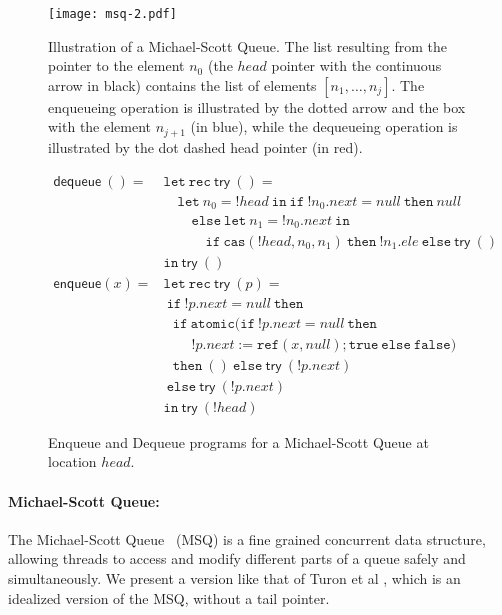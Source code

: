 \documentclass[nocopyrightspace,preprint]{sigplanconf}
\newcommand{\keywd}[1]{\mathtt{#1}}
\newcommand{\myread}[1]{!{#1}}
\newcommand{\myref}[1]{\keywd{ref}(#1)}
\newcommand{\mtrue}{\keywd{true}}
\newcommand{\mfalse}{\keywd{false}}
\newcommand{\cas}[3]{\keywd{cas}( #1, #2, #3)}
\begin{document}
\begin{figure}[t]
\begin{center}
 \texttt{[image: msq-2.pdf]} 
 \end{center}
\caption{Illustration of a Michael-Scott Queue. The list resulting from the pointer to the element $n_0$ (the $head$ pointer with the continuous arrow in black) contains the list of elements $[n_1, \ldots, n_j]$. The enqueueing operation is illustrated by the dotted arrow and the box with the element $n_{j+1}$ (in blue), while the dequeueing operation is illustrated by the dot dashed head pointer (in red).}
 \label{fig:MSQ}
\[
  \begin{array}{ll}
      \mathsf{dequeue}~ () = & \keywd{let\ rec}~ \mathsf{try}~() = \\&
   \quad \keywd{let}~ n_0 = \myread{head} ~\keywd{in}~
   \keywd{if}~\myread{n_0}.next = null~ \keywd{then}~ null~ 
   \\ & \qquad \keywd{else}~ \keywd{let}~ n_1 = \myread{n_0}.next ~\keywd{in}~
   \\ & \quad \qquad \keywd{if}~\cas{\myread{head}}{n_0}{n_1}~\keywd{then}~\myread{n_1}.ele~ \keywd{else}~ \mathsf{try}~() \\&
   \keywd{in}~\mathsf{try}~() \\[5pt]



   \mathsf{enqueue}(x) =& \keywd{let\ rec}~\mathsf{try}~(p) = \\&\ \keywd{if}\ !p.next=null\ \keywd{then}\\
   & ~~~ \keywd{if}~ \keywd{atomic}( \keywd{if}~!p.next=null~ \keywd{then}~\\
   & \qquad !p.next:=\myref{x,null}; \mtrue~\keywd{else}~\mfalse)\\
  &~~~ \keywd{then}~ ()~ \keywd{else}~ \mathsf{try}~ (\myread{p}.next)\\ 
&\ \keywd{else}\ \mathsf{try}\ (\myread{p}.next)\\
 &\keywd{in}~ \mathsf{try}~(\myread{head})
  \end{array}
 \] 
\caption{Enqueue and Dequeue programs for a Michael-Scott Queue at location $head$.}
 \label{fig:deqenq}
 \vspace{-3mm}
 \end{figure}


 \paragraph{Michael-Scott Queue:} The Michael-Scott
 Queue~\cite{michael-scott} (MSQ) is a fine grained concurrent data
 structure, allowing threads to access and modify
 different parts of a queue safely and simultaneously. We present a version like that of Turon et al  \cite{dreyer}, which is an idealized version of the MSQ, without a tail pointer. 
 
\end{document}
